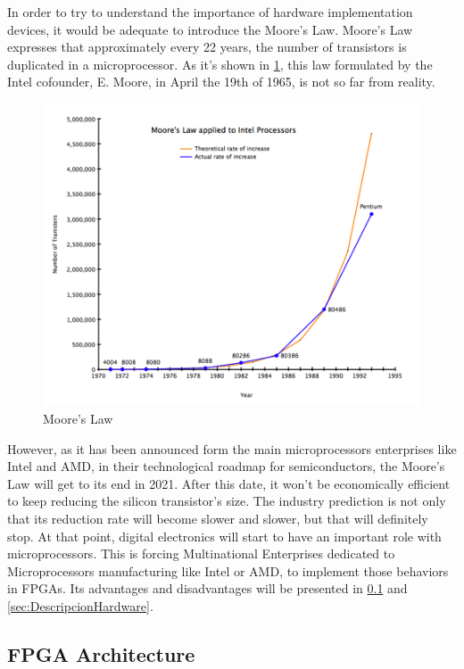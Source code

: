 In order to try to understand the importance of hardware implementation devices, it would be adequate to introduce the Moore’s Law. Moore’s Law expresses that approximately every 22 years, the number of transistors is duplicated in a
microprocessor. As it’s shown in \ref{fig:Ley_de_Moore}, this law formulated by the Intel cofounder, E. Moore, in April the 19th of 1965, is not so far from reality.
\newline
\begin{figure}[H]
	\center
	\includegraphics[scale=0.7]{imagenes/EstadoArte/MooresLaw.png}
	\caption{Moore's Law}
	\label{fig:Ley_de_Moore}
\end{figure}
 

However, as it has been announced form the main microprocessors enterprises like Intel and AMD, in their technological roadmap for semiconductors, the Moore’s Law will get to its end in 2021. After this date, it won’t be economically efficient to keep reducing the silicon transistor’s size. The industry prediction is not only that its reduction rate will become slower and slower, but that will definitely stop. At that point, digital electronics will start to have an important role with microprocessors. This is forcing Multinational Enterprises dedicated to Microprocessors manufacturing like Intel or AMD, to implement those behaviors in FPGAs. Its advantages and disadvantages will be presented in \ref{sec:ArquitecturaFPGA} and \ref{sec:DescripcionHardware}.
\newpage
\subsection{FPGA Architecture}\label{sec:ArquitecturaFPGA}

